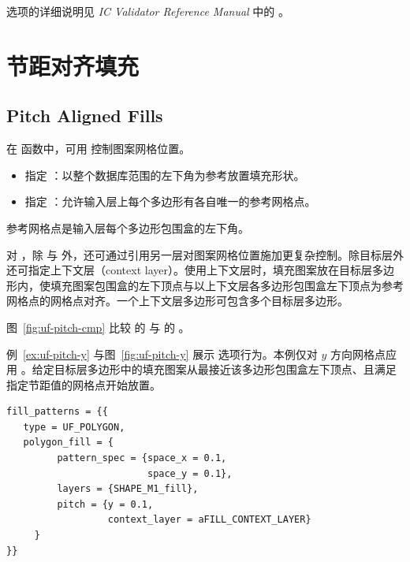 选项的详细说明见 \textit{IC Validator Reference Manual} 中的 。

\section{节距对齐填充}
\subsection*{Pitch Aligned Fills}

在  函数中，可用  控制图案网格位置。
\begin{itemize}
  \item 指定 ：以整个数据库范围的左下角为参考放置填充形状。
  \item 指定 ：允许输入层上每个多边形有各自唯一的参考网格点。
\end{itemize}
参考网格点是输入层每个多边形包围盒的左下角。

对 ，除  与  外，还可通过引用另一层对图案网格位置施加更复杂控制。除目标层外还可指定上下文层（context layer）。使用上下文层时，填充图案放在目标层多边形内，使填充图案包围盒的左下顶点与以上下文层各多边形包围盒左下顶点为参考网格点的网格点对齐。一个上下文层多边形可包含多个目标层多边形。

图~\ref{fig:uf-pitch-cmp} 比较  的  与  的 。


例~\ref{ex:uf-pitch-y} 与图~\ref{fig:uf-pitch-y} 展示  选项行为。本例仅对 $y$ 方向网格点应用 。给定目标层多边形中的填充图案从最接近该多边形包围盒左下顶点、且满足指定节距值的网格点开始放置。

\begin{lstlisting}[style=pxl,caption={仅在 Y 方向应用 pitch 选项},label={ex:uf-pitch-y}]
fill_patterns = {{
   type = UF_POLYGON,
   polygon_fill = {
         pattern_spec = {space_x = 0.1,
                         space_y = 0.1},
         layers = {SHAPE_M1_fill},
         pitch = {y = 0.1,
                  context_layer = aFILL_CONTEXT_LAYER}
     }
}}
\end{lstlisting}


